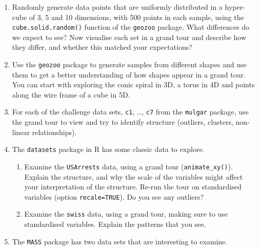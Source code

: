 \documentclass[
  letterpaper,
]{krantz}
\providecommand{\tightlist}{%
  \setlength{\itemsep}{0pt}\setlength{\parskip}{0pt}}\usepackage{longtable,booktabs,array}
\begin{document}
\begin{enumerate}
\def\labelenumi{\arabic{enumi}.}
\tightlist
\item
  Randomly generate data points that are uniformly distributed in a
  hyper-cube of 3, 5 and 10 dimensions, with 500 points in each sample,
  using the \texttt{cube.solid.random()} function of the \texttt{geozoo}
  package. What differences do we expect to see? Now visualise each set
  in a grand tour and describe how they differ, and whether this matched
  your expectations?
\item
  Use the \texttt{geozoo} package to generate samples from different
  shapes and use them to get a better understanding of how shapes appear
  in a grand tour. You can start with exploring the conic spiral in 3D,
  a torus in 4D and points along the wire frame of a cube in 5D.
\item
  For each of the challenge data sets, \texttt{c1}, \ldots, \texttt{c7}
  from the \texttt{mulgar} package, use the grand tour to view and try
  to identify structure (outliers, clusters, non-linear relationships).
\item
  The \texttt{datasets} package in R has some classic data to explore.

  \begin{enumerate}
  \def\labelenumii{\alph{enumii}.}
  \tightlist
  \item
    Examine the \texttt{USArrests} data, using a grand tour
    (\texttt{animate\_xy()}). Explain the structure, and why the scale
    of the variables might affect your interpretation of the structure.
    Re-run the tour on standardised variables (option
    \texttt{recale=TRUE}). Do you see any outliers?
  \item
    Examine the \texttt{swiss} data, using a grand tour, making sure to
    use standardised variables. Explain the patterns that you see.
  \end{enumerate}
\item
  The \texttt{MASS} package has two data sets that are interesting to
  examine.


\end{enumerate}
\end{document}
